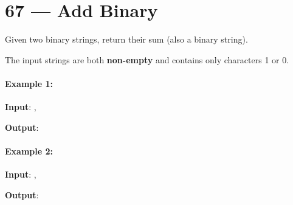 \section{67 --- Add Binary}
Given two binary strings, return their sum (also a binary string).

The input strings are both \textbf{non-empty} and contains only characters 1 or 0.

\paragraph{Example 1:}

\begin{flushleft}
\textbf{Input}: , 

\textbf{Output}: 
\end{flushleft}

\paragraph{Example 2:}

\begin{flushleft}
\textbf{Input}: , 

\textbf{Output}: 
\end{flushleft}